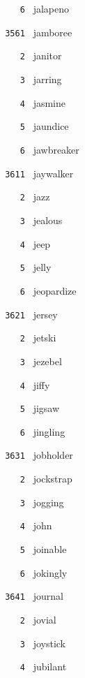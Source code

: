 \documentclass[11pt]{article}
\begin{document}
\begin{multicols}{6}
\noindent \texttt{ \ \ \ 6 } jalapeno  \par
\vspace{3mm}
\noindent \texttt{ 3561 } jamboree  \par
\noindent \texttt{ \ \ \ 2 } janitor  \par
\noindent \texttt{ \ \ \ 3 } jarring  \par
\noindent \texttt{ \ \ \ 4 } jasmine  \par
\noindent \texttt{ \ \ \ 5 } jaundice  \par
\noindent \texttt{ \ \ \ 6 } jawbreaker  \par
\noindent \texttt{ 3611 } jaywalker  \par
\noindent \texttt{ \ \ \ 2 } jazz  \par
\noindent \texttt{ \ \ \ 3 } jealous  \par
\noindent \texttt{ \ \ \ 4 } jeep  \par
\noindent \texttt{ \ \ \ 5 } jelly  \par
\noindent \texttt{ \ \ \ 6 } jeopardize  \par
\vspace{3mm}
\noindent \texttt{ 3621 } jersey  \par
\noindent \texttt{ \ \ \ 2 } jetski  \par
\noindent \texttt{ \ \ \ 3 } jezebel  \par
\noindent \texttt{ \ \ \ 4 } jiffy  \par
\noindent \texttt{ \ \ \ 5 } jigsaw  \par
\noindent \texttt{ \ \ \ 6 } jingling  \par
\vspace{3mm}
\noindent \texttt{ 3631 } jobholder  \par
\noindent \texttt{ \ \ \ 2 } jockstrap  \par
\noindent \texttt{ \ \ \ 3 } jogging  \par
\noindent \texttt{ \ \ \ 4 } john  \par
\noindent \texttt{ \ \ \ 5 } joinable  \par
\noindent \texttt{ \ \ \ 6 } jokingly  \par
\vspace{3mm}
\noindent \texttt{ 3641 } journal  \par
\noindent \texttt{ \ \ \ 2 } jovial  \par
\noindent \texttt{ \ \ \ 3 } joystick  \par
\noindent \texttt{ \ \ \ 4 } jubilant  \par

\end{multicols}
\end{document}
